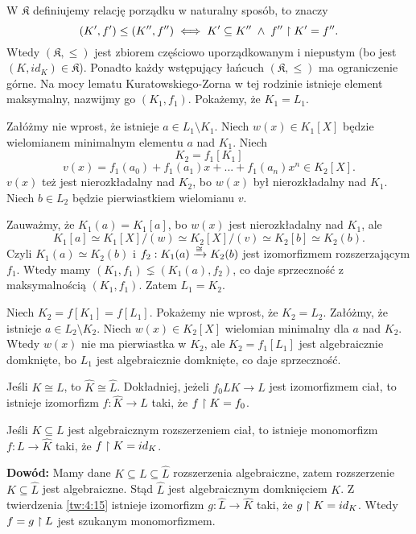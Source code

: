 W $\mathfrak{K}$ definiujemy relację porządku w naturalny sposób, to znaczy
$$(K', f')\leq(K'', f'')\iff K'\subseteq K''\;\land\;f''\upharpoonright K'=f''.$$
Wtedy $(\mathfrak{K},\leq)$ jest zbiorem częściowo uporządkowanym i niepustym (bo jest $(K,id_K)\in\mathfrak{K}$). Ponadto każdy wstępujący łańcuch $(\mathfrak{K},\leq)$ ma ograniczenie górne. Na mocy lematu Kuratowskiego-Zorna w tej rodzinie istnieje element maksymalny, nazwijmy go $(K_1,f_1)$. Pokażemy, że $K_1=L_1$.

Załóżmy nie wprost, że istnieje $a\in L_1\setminus K_1$. Niech $w(x)\in K_1[X]$ będzie wielomianem minimalnym elementu $a$ nad $K_1$. Niech
$$K_2=f_1[K_1]$$
$$v(x)=f_1(a_0)+f_1(a_1)x+...+f_1(a_n)x^n\in K_2[X].$$
$v(x)$ też jest nierozkładalny nad $K_2$, bo $w(x)$ był nierozkładalny nad $K_1$. Niech $b\in L_2$ będzie pierwiastkiem wielomianu $v$.

Zauważmy, że $K_1(a)=K_1[a]$, bo $w(x)$ jest nierozkładalny nad $K_1$, ale
$$K_1[a]\simeq K_1[X]/(w)\simeq K_2[X]/(v)\simeq K_2[b]\simeq K_2(b).$$
Czyli $K_1(a)\simeq K_2(b)$ i $f_2:K_1(a)\xrightarrow[]{\cong}K_2(b)$ jest izomorfizmem rozszerzającym $f_1$. Wtedy mamy $(K_1,f_1)\lneq(K_1(a),f_2)$, co daje sprzeczność z maksymalnością $(K_1,f_1)$. Zatem $L_1=K_2$.

Niech $K_2=f[K_1]=f[L_1]$. Pokażemy nie wprost, że $K_2=L_2$. Załóżmy, że istnieje $a\in L_2\setminus K_2$. Niech $w(x)\in K_2[X]$ wielomian minimalny dla $a$ nad $K_2$. Wtedy $w(x)$ nie ma pierwiastka w $K_2$, ale $K_2=f_1[L_1]$ jest algebraicznie domknięte, bo $L_1$ jest algebraicznie domknięte, co daje sprzeczność.

\begin{wniosek}
    Jeśli $K\cong L$, to $\hat{K}\cong \hat{L}$. Dokładniej, jeżeli $f_0LK\to L$ jest izomorfizmem ciał, to istnieje izomorfizm $f:\hat{K}\to\hat{L}$ taki, że $f\upharpoonright K=f_0$.
\end{wniosek}

\begin{wniosek}
    Jeśli $K\subseteq L$ jest algebraicznym rozszerzeniem ciał, to istnieje monomorfizm $f:L\to \hat{K}$ taki, że $f\upharpoonright K=id_K$.
\end{wniosek}

\textbf{Dowód:} Mamy dane $K\subseteq L\subseteq\hat{L}$ rozszerzenia algebraiczne, zatem rozszerzenie $K\subseteq\hat{L}$ jest algebraiczne. Stąd $\hat{L}$ jest algebraicznym domknięciem $K$. Z twierdzenia \ref{tw:4:15} istnieje izomorfizm $g:\hat{L}\to\hat{K}$ taki, że $g\upharpoonright K=id_K$. Wtedy $f=g\upharpoonright L$ jest szukanym monomorfizmem.
